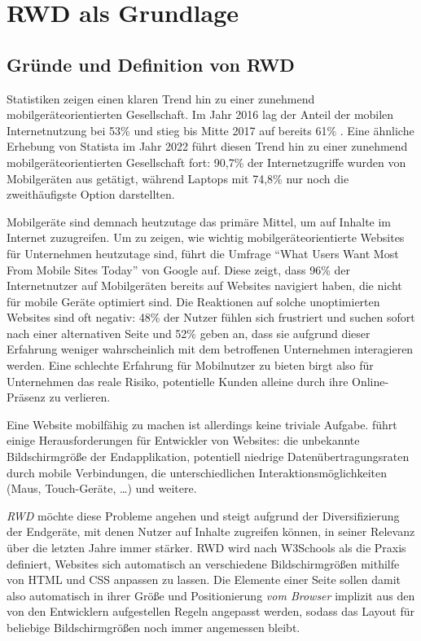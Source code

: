 \section{\ac{RWD} als Grundlage}\label{sec:responsive-webdesign-rwd-als-grundlage}

\subsection{Gründe und Definition von \ac{RWD}}\label{subsec:grunde-und-definition-von-rwd}


Statistiken zeigen einen klaren Trend hin zu einer zunehmend mobilgeräteorientierten Gesellschaft.
Im Jahr 2016 lag der Anteil der mobilen Internetnutzung bei 53\% und stieg bis Mitte 2017 auf bereits 61\% \autocite{statista.GWI.2017}.
Eine ähnliche Erhebung von Statista \autocite{statista.DataReportal.WeAreSocial.Hootsuite.2023} im Jahr 2022 führt diesen Trend hin zu einer zunehmend mobilgeräteorientierten Gesellschaft fort:
90,7\% der Internetzugriffe wurden von Mobilgeräten aus getätigt, während Laptops mit 74,8\% nur noch die zweithäufigste Option darstellten.

Mobilgeräte sind demnach heutzutage das primäre Mittel, um auf Inhalte im Internet zuzugreifen.
Um zu zeigen, wie wichtig mobilgeräteorientierte Websites für Unternehmen heutzutage sind, führt \autocite[S. 25]{Harmsen.2018} die Umfrage "`What Users Want Most From Mobile Sites Today"' von Google \autocite{Google.WhatUsersWantFromMobile.2012} auf.
Diese zeigt, dass 96\% der Internetnutzer auf Mobilgeräten bereits auf Websites navigiert haben, die nicht für mobile Geräte optimiert sind.
Die Reaktionen auf solche unoptimierten Websites sind oft negativ: 48\% der Nutzer fühlen sich frustriert und suchen sofort nach einer alternativen Seite und 52\% geben an, dass sie aufgrund dieser Erfahrung weniger wahrscheinlich mit dem betroffenen Unternehmen interagieren werden.
Eine schlechte Erfahrung für Mobilnutzer zu bieten birgt also für Unternehmen das reale Risiko, potentielle Kunden alleine durch ihre Online-Präsenz zu verlieren.

Eine Website mobilfähig zu machen ist allerdings keine triviale Aufgabe.
\autocite[S. 25--33]{Harmsen.2018} führt einige Herausforderungen für Entwickler von Websites:
die unbekannte Bildschirmgröße der Endapplikation, potentiell niedrige Datenübertragungsraten durch mobile Verbindungen, die unterschiedlichen Interaktionsmöglichkeiten (Maus, Touch-Geräte, \ldots) und weitere.

\emph{\acl{RWD}} möchte diese Probleme angehen und steigt aufgrund der Diversifizierung der Endgeräte, mit denen Nutzer auf Inhalte zugreifen können, in seiner Relevanz über die letzten Jahre immer stärker.
\ac{RWD} wird nach W3Schools \autocite{W3Schools.ResponsiveWebDesign.2024} als die Praxis definiert, Websites sich automatisch an verschiedene Bildschirmgrößen mithilfe von \ac{HTML} und \ac{CSS} anpassen zu lassen.
Die Elemente einer Seite sollen damit also automatisch in ihrer Größe und Positionierung \emph{vom Browser} implizit aus den von den Entwicklern aufgestellen Regeln angepasst werden, sodass das Layout für beliebige Bildschirmgrößen noch immer angemessen bleibt.

